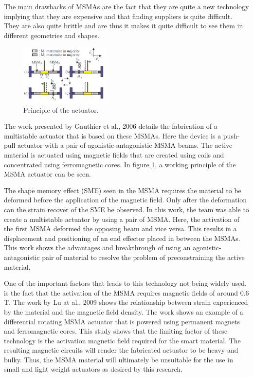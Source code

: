 The main drawbacks of MSMAs are the fact that they are quite a new technology implying that they are expensive and that finding suppliers is quite difficult. They are also quite brittle and are thus it makes it quite difficult to see them in different geometries and shapes.
\begin{figure}
	\centering
	\includegraphics[width=0.4\textwidth]{Figures/MSMA_princ.png}
	\caption{Principle of the actuator\cite{gauthier_multistable_2006}.}
	\label{fig:MSMA_princ}
\end{figure}
The work presented by Gauthier et al., 2006\cite{gauthier_multistable_2006} details the fabrication of a multistable actuator that is based on these MSMAs. Here the device is a push-pull actuator with a pair of agonistic-antagonistic MSMA beams. The active material is actuated using magnetic fields that are created using coils and concentrated using ferromagnetic cores. In figure \ref{fig:MSMA_princ}, a working principle of the MSMA actuator can be seen.

The shape memory effect (SME) seen in the MSMA requires the material to be deformed before the application of the magnetic field. Only after the deformation can the strain recover of the SME be observed. In this work, the team was able to create a multistable actuator by using a pair of MSMA. Here, the activation of the first MSMA deformed the opposing beam and vice versa. This results in a displacement and positioning of an end effector placed in between the MSMAs. This work shows the advantages and breakthrough of using an agonistic-antagonistic pair of material to resolve the problem of preconstraining the active material.

One of the important factors that leads to this technology not being widely used, is the fact that the activation of the MSMA requires magnetic fields of around 0.6 T. The work by Lu at al., 2009\cite{lu_optimal_2009} shows the relationship between strain experienced by the material and the magnetic field density. The work shows an example of a differential rotating MSMA actuator that is powered using permanent magnets and ferromagnetic cores. This study shows that the limiting factor of these technology is the activation magnetic field required for the smart material. The resulting magnetic circuits will render the fabricated actuator to be heavy and bulky. Thus, the MSMA material will ultimately be unsuitable for the use in small and light weight actuators as desired by this research.

